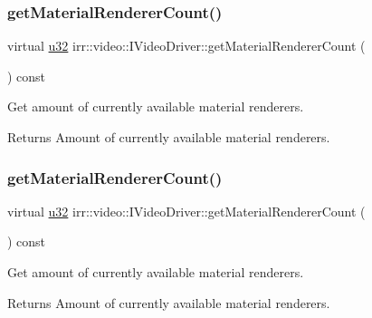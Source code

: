 \subsubsection{\texorpdfstring{get\+Material\+Renderer\+Count()}{getMaterialRendererCount()}\hspace{0.1cm}{\footnotesize\ttfamily [1/2]}}
{\footnotesize\ttfamily virtual \hyperlink{namespaceirr_a0416a53257075833e7002efd0a18e804}{u32} irr\+::video\+::\+I\+Video\+Driver\+::get\+Material\+Renderer\+Count (\begin{DoxyParamCaption}{ }\end{DoxyParamCaption}) const\hspace{0.3cm}{\ttfamily [pure virtual]}}



Get amount of currently available material renderers. 

\begin{DoxyReturn}{Returns}
Amount of currently available material renderers. 
\end{DoxyReturn}
\mbox{\label{classirr_1_1video_1_1IVideoDriver_ac1d0e2e952afdcdbdd915dc106375381}} 
\subsubsection{\texorpdfstring{get\+Material\+Renderer\+Count()}{getMaterialRendererCount()}\hspace{0.1cm}{\footnotesize\ttfamily [2/2]}}
{\footnotesize\ttfamily virtual \hyperlink{namespaceirr_a0416a53257075833e7002efd0a18e804}{u32} irr\+::video\+::\+I\+Video\+Driver\+::get\+Material\+Renderer\+Count (\begin{DoxyParamCaption}{ }\end{DoxyParamCaption}) const\hspace{0.3cm}{\ttfamily [pure virtual]}}



Get amount of currently available material renderers. 

\begin{DoxyReturn}{Returns}
Amount of currently available material renderers. 
\end{DoxyReturn}
\mbox{\label{classirr_1_1video_1_1IVideoDriver_ac6f8c53abcd5a24d94c84185b0ef65e0}} 
